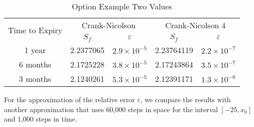 \documentclass[00main.tex]{subfiles}
\begin{document}
\begin{table}
  \centering
  \small
    \begin{tabular}{c|cccc}
    \multirow{2}{*}{Time to Expiry} & \multicolumn{2}{c}{Crank-Nicolson} & \multicolumn{2}{c}{Crank-Nicolson 4} \\
	 & $S_f$ & $\varepsilon$ & $S_f$ & $\varepsilon$ \\ \hline
     1 year    & 
     2.2377065 & $2.9 \times 10^{-5}$ & 
     2.23764119 & $2.2 \times 10^{-7}$ \\
     6 months    & 
     2.1725228 & $3.8 \times 10^{-5}$ & 
     2.17243864 & $3.5 \times 10^{-7}$ \\
     3 months    & 
     2.1240261 & $5.3 \times 10^{-5}$ & 
     2.12391171 & $1.3\times 10^{-6}$\\
    \end{tabular}%
    \caption{Option Example Two Values}
  \label{option_ex2}%
\end{table}%




For the approximation of the relative error $\varepsilon$, we compare the results with another approximation that uses 60,000 steps in space for the interval $[-25,x_0]$ and 1,000 steps in time.
\end{document}
